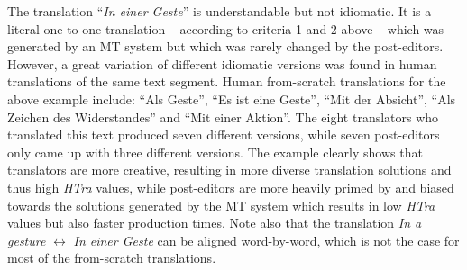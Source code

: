 \documentclass[output=paper]{LSP/langsci}
\begin{document}
The  translation ``\textit{In einer Geste}'' is understandable but not idiomatic. It is a literal one-to-one translation -- according to criteria 1 and 2 above -- which was generated by an MT system but which was rarely changed by the post-editors. However, a great variation of different idiomatic versions was found in human translations of the same text segment. Human from-scratch translations for the above example include: ``Als Geste'', ``Es ist eine Geste'', ``Mit der Absicht'', ``Als Zeichen des Widerstandes'' and ``Mit einer Aktion''. The eight translators who translated this text produced seven different versions, while seven post-editors only came up with three different versions. The example clearly shows that translators are more creative, resulting in more diverse translation solutions and thus high \textit{HTra} values, while post-editors are more heavily primed by and biased towards the solutions generated by the MT system which results in low \textit{HTra} values but also faster production times. Note also that the translation \textit{In a gesture} $\leftrightarrow$ \textit{In einer Geste} can be aligned word-by-word, which is not the case for most of the from-scratch translations.
\end{document}

